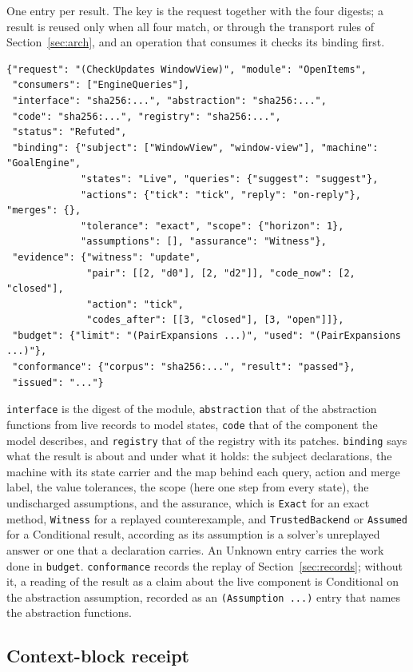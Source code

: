 \documentclass[11pt]{article}
\newcommand{\code}[1]{\texttt{#1}}
\theoremstyle{definition}
\theoremstyle{plain}
\begin{document}
One entry per result. The key is the request together with the four digests; a result is reused
only when all four match, or through the transport rules of Section~\ref{sec:arch}, and an
operation that consumes it checks its binding first.
\begin{lstlisting}
{"request": "(CheckUpdates WindowView)", "module": "OpenItems",
 "consumers": ["EngineQueries"],
 "interface": "sha256:...", "abstraction": "sha256:...",
 "code": "sha256:...", "registry": "sha256:...",
 "status": "Refuted",
 "binding": {"subject": ["WindowView", "window-view"], "machine": "GoalEngine",
             "states": "Live", "queries": {"suggest": "suggest"},
             "actions": {"tick": "tick", "reply": "on-reply"}, "merges": {},
             "tolerance": "exact", "scope": {"horizon": 1},
             "assumptions": [], "assurance": "Witness"},
 "evidence": {"witness": "update",
              "pair": [[2, "d0"], [2, "d2"]], "code_now": [2, "closed"],
              "action": "tick",
              "codes_after": [[3, "closed"], [3, "open"]]},
 "budget": {"limit": "(PairExpansions ...)", "used": "(PairExpansions ...)"},
 "conformance": {"corpus": "sha256:...", "result": "passed"},
 "issued": "..."}
\end{lstlisting}
\code{interface} is the digest of the module, \code{abstraction} that of the abstraction functions
from live records to model states, \code{code} that of the component the model describes, and
\code{registry} that of the registry with its patches. \code{binding} says what the result is about
and under what it holds: the subject declarations, the machine with its state carrier and the map
behind each query, action and merge label, the value tolerances, the scope (here one step from
every state), the undischarged assumptions, and the assurance, which is \code{Exact} for an exact
method, \code{Witness} for a replayed counterexample, and \code{TrustedBackend} or \code{Assumed}
for a Conditional result, according as its assumption is a solver's unreplayed answer or one that
a declaration carries. An Unknown entry carries the work done in \code{budget}.
\code{conformance} records the replay of Section~\ref{sec:records}; without it, a reading of the
result as a claim about the live component is Conditional on the abstraction assumption, recorded
as an \code{(Assumption ...)} entry that names the abstraction functions.

\subsection{Context-block receipt}
\end{document}
